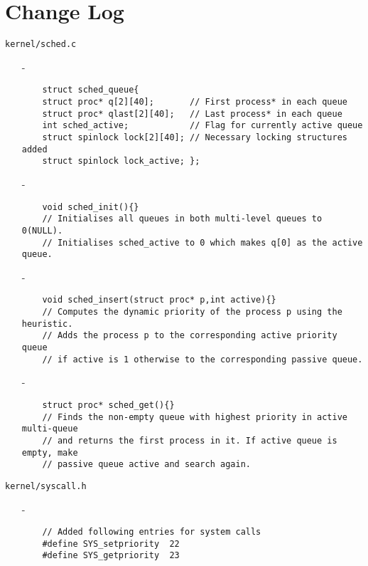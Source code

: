 \documentclass[11pt]{article}
\begin{document}
\pagebreak

\section{Change Log}

\texttt{kernel/sched.c}
\begin{enumerate}
    \item[-]\begin{verbatim}
    struct sched_queue{
	struct proc* q[2][40];       // First process* in each queue
	struct proc* qlast[2][40];   // Last process* in each queue
	int sched_active;            // Flag for currently active queue
	struct spinlock lock[2][40]; // Necessary locking structures added
	struct spinlock lock_active; };
    \end{verbatim}
    \item[-]\begin{verbatim}
    void sched_init(){}
    // Initialises all queues in both multi-level queues to 0(NULL).
    // Initialises sched_active to 0 which makes q[0] as the active queue.
    \end{verbatim}
    \item[-]\begin{verbatim}
    void sched_insert(struct proc* p,int active){}
    // Computes the dynamic priority of the process p using the heuristic.
    // Adds the process p to the corresponding active priority queue
    // if active is 1 otherwise to the corresponding passive queue.
    \end{verbatim}
    \item[-]\begin{verbatim}
    struct proc* sched_get(){}
    // Finds the non-empty queue with highest priority in active multi-queue
    // and returns the first process in it. If active queue is empty, make
    // passive queue active and search again.
    \end{verbatim}
\end{enumerate}

\texttt{kernel/syscall.h}
\begin{enumerate}
    \item[-]\begin{verbatim}
    // Added following entries for system calls
    #define SYS_setpriority  22
    #define SYS_getpriority  23
    \end{verbatim}
\end{enumerate}
\end{document}
